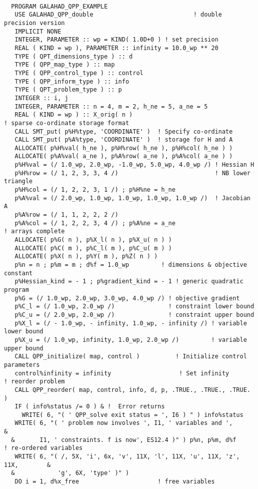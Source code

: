 \documentclass{galahad}
\begin{document}
{\tt \small
\begin{verbatim}
  PROGRAM GALAHAD_QPP_EXAMPLE
   USE GALAHAD_QPP_double                            ! double precision version
   IMPLICIT NONE
   INTEGER, PARAMETER :: wp = KIND( 1.0D+0 ) ! set precision
   REAL ( KIND = wp ), PARAMETER :: infinity = 10.0_wp ** 20
   TYPE ( QPT_dimensions_type ) :: d
   TYPE ( QPP_map_type ) :: map
   TYPE ( QPP_control_type ) :: control        
   TYPE ( QPP_inform_type ) :: info
   TYPE ( QPT_problem_type ) :: p
   INTEGER :: i, j
   INTEGER, PARAMETER :: n = 4, m = 2, h_ne = 5, a_ne = 5
   REAL ( KIND = wp ) :: X_orig( n )
! sparse co-ordinate storage format
   CALL SMT_put( p%H%type, 'COORDINATE' )  ! Specify co-ordinate 
   CALL SMT_put( p%A%type, 'COORDINATE' )  ! storage for H and A
   ALLOCATE( p%H%val( h_ne ), p%H%row( h_ne ), p%H%col( h_ne ) )
   ALLOCATE( p%A%val( a_ne ), p%A%row( a_ne ), p%A%col( a_ne ) )
   p%H%val = (/ 1.0_wp, 2.0_wp, -1.0_wp, 5.0_wp, 4.0_wp /) ! Hessian H
   p%H%row = (/ 1, 2, 3, 3, 4 /)                           ! NB lower triangle
   p%H%col = (/ 1, 2, 2, 3, 1 /) ; p%H%ne = h_ne
   p%A%val = (/ 2.0_wp, 1.0_wp, 1.0_wp, 1.0_wp, 1.0_wp /)  ! Jacobian A
   p%A%row = (/ 1, 1, 2, 2, 2 /)
   p%A%col = (/ 1, 2, 2, 3, 4 /) ; p%A%ne = a_ne
! arrays complete
   ALLOCATE( p%G( n ), p%X_l( n ), p%X_u( n ) )
   ALLOCATE( p%C( m ), p%C_l( m ), p%C_u( m ) )
   ALLOCATE( p%X( n ), p%Y( m ), p%Z( n ) )
   p%n = n ; p%m = m ; d%f = 1.0_wp         ! dimensions & objective constant
   p%Hessian_kind = - 1 ; p%gradient_kind = - 1 ! generic quadratic program
   p%G = (/ 1.0_wp, 2.0_wp, 3.0_wp, 4.0_wp /) ! objective gradient
   p%C_l = (/ 1.0_wp, 2.0_wp /)               ! constraint lower bound
   p%C_u = (/ 2.0_wp, 2.0_wp /)               ! constraint upper bound
   p%X_l = (/ - 1.0_wp, - infinity, 1.0_wp, - infinity /) ! variable lower bound
   p%X_u = (/ 1.0_wp, infinity, 1.0_wp, 2.0_wp /)         ! variable upper bound
   CALL QPP_initialize( map, control )          ! Initialize control parameters
   control%infinity = infinity                   ! Set infinity
! reorder problem
   CALL QPP_reorder( map, control, info, d, p, .TRUE., .TRUE., .TRUE. )
   IF ( info%status /= 0 ) & !  Error returns
     WRITE( 6, "( ' QPP_solve exit status = ', I6 ) " ) info%status
   WRITE( 6, "( ' problem now involves ', I1, ' variables and ',               &
  &       I1, ' constraints. f is now', ES12.4 )" ) p%n, p%m, d%f
! re-ordered variables
   WRITE( 6, "( /, 5X, 'i', 6x, 'v', 11X, 'l', 11X, 'u', 11X, 'z', 11X,        &
  &            'g', 6X, 'type' )" )
   DO i = 1, d%x_free                      ! free variables

\end{verbatim}}
\end{document}
